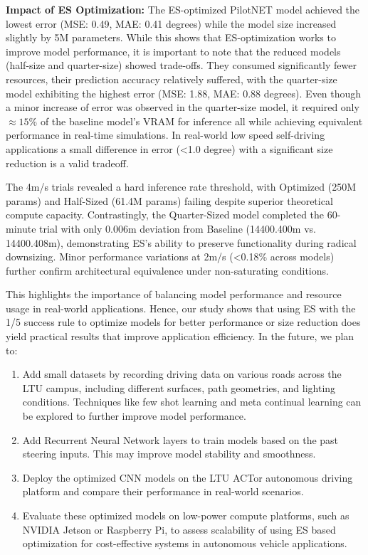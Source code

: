 \documentclass[conference]{IEEEtran}
\begin{document}
\textbf{Impact of ES Optimization: }The ES-optimized PilotNET model achieved the lowest error (MSE: 0.49, MAE: 0.41 degrees) while the model size increased slightly by 5M parameters. While this shows that ES-optimization works to improve model performance, it is important to note that the reduced models (half-size and quarter-size) showed trade-offs. They consumed significantly fewer resources, their prediction accuracy relatively suffered, with the quarter-size model exhibiting the highest error (MSE: 1.88, MAE: 0.88 degrees). Even though a minor increase of error was observed in the quarter-size model, it required only \(\approx{15}\)\% of the baseline model's VRAM for inference all while achieving equivalent performance in real-time simulations. In real-world low speed self-driving applications a small difference in error (\textless1.0 degree) with a significant size reduction is a valid tradeoff.

The 4m/s trials revealed a hard inference rate threshold, with Optimized (250M params) and Half-Sized (61.4M params) failing despite superior theoretical compute capacity. Contrastingly, the Quarter-Sized model completed the 60-minute trial with only 0.006m deviation from Baseline (14400.400m vs. 14400.408m), demonstrating ES's ability to preserve functionality during radical downsizing. Minor performance variations at 2m/s (\textless0.18\% across models) further confirm architectural equivalence under non-saturating conditions.

This highlights the importance of balancing model performance and resource usage in real-world applications. Hence, our study shows that using ES with the 1/5 success rule to optimize models for better performance or size reduction does yield practical results that improve application efficiency. In the future, we plan to:
\begin{enumerate}
    \item Add small datasets by recording driving data on various roads across the LTU campus, including different surfaces, path geometries, and lighting conditions. Techniques like few shot learning and meta continual learning can be explored to further improve model performance.
    \item Add Recurrent Neural Network layers to train models based on the past steering inputs. This may improve model stability and smoothness.
    \item Deploy the optimized CNN models on the LTU ACTor autonomous driving platform and compare their performance in real-world scenarios.
    \item Evaluate these optimized models on low-power compute platforms, such as NVIDIA Jetson or Raspberry Pi, to assess scalability of using ES based optimization for cost-effective systems in autonomous vehicle applications.
\end{enumerate}

\clearpage
\end{document}
